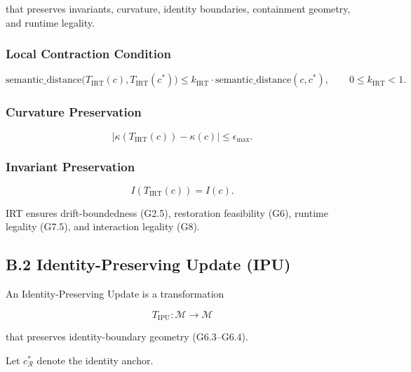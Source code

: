 that preserves invariants, curvature, identity boundaries, containment geometry,
and runtime legality.

\subsubsection*{Local Contraction Condition}



\[
\text{semantic\_distance}\big(T_{\mathrm{IRT}}(c), T_{\mathrm{IRT}}(c^*)\big)
\le k_{\mathrm{IRT}} \cdot \text{semantic\_distance}(c, c^*),
\qquad 0 \le k_{\mathrm{IRT}} < 1.
\]



\subsubsection*{Curvature Preservation}



\[
|\kappa(T_{\mathrm{IRT}}(c)) - \kappa(c)| \le \epsilon_{\max}.
\]



\subsubsection*{Invariant Preservation}



\[
I(T_{\mathrm{IRT}}(c)) = I(c).
\]



\noindent IRT ensures drift-boundedness (G2.5), restoration feasibility (G6),
runtime legality (G7.5), and interaction legality (G8).


\subsection*{B.2 Identity-Preserving Update (IPU)}

\noindent An Identity-Preserving Update is a transformation



\[
T_{\mathrm{IPU}} : \mathcal{M} \rightarrow \mathcal{M}
\]



that preserves identity-boundary geometry (G6.3--G6.4).

Let $c_{\mathcal{R}}^*$ denote the identity anchor.

